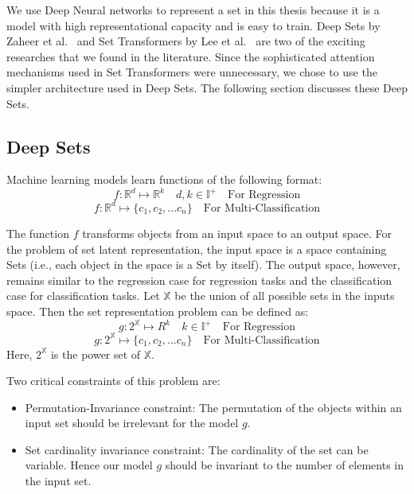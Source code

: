 \documentclass[12pt, twoside, ngerman]{report}
\begin{document}
We use Deep Neural networks to represent a set in this thesis because it is a model with high representational capacity and is easy to train.
Deep Sets by Zaheer et al.~\cite{deepSets} and Set Transformers by Lee et al.~\cite{setTransformer} are two of the exciting researches that we found in the literature.
Since the sophisticated attention mechanisms used in Set Transformers were unnecessary,  we chose to use the simpler architecture used in Deep Sets.
The following section discusses these Deep Sets.

\subsection{Deep Sets}
\label{sec:DeepSets}

Machine learning models learn functions of the following format:
$$
f : \mathbb{R}^d \mapsto \mathbb{R}^k \quad d,k \in \mathbb{I}^+ \quad \textrm{For Regression}
$$
$$
f : \mathbb{R}^d \mapsto \{c_1, c_2, ... c_n\}  \quad \textrm{For Multi-Classification}
$$

The function $f$ transforms objects from an input space to an output space.
For the problem of set latent representation, the input space is a space containing Sets (i.e., each object in the space is a Set by itself).
The output space, however, remains similar to the regression case for regression tasks and the classification case for classification tasks.
Let $\mathbb{X}$ be the union of all possible sets in the inputs space.
Then the set representation problem can be defined as:
$$
g : 2^{\mathbb{X}} \mapsto R^k   \quad k \in \mathbb{I}^+ \quad \textrm{For Regression}
$$
$$
g : 2^{\mathbb{X}} \mapsto \{c_1, c_2, ... c_n\}  \quad \textrm{For Multi-Classification}
$$
Here, $2^{\mathbb{X}}$ is the power set of $\mathbb{X}$.

Two critical constraints of this problem are:
\begin{itemize}
\item Permutation-Invariance constraint: The permutation of the objects within an input set should be irrelevant for the model $g$.
\item Set cardinality invariance constraint: The cardinality of the set can be variable.
Hence our model $g$ should be invariant to the number of elements in the input set.
\end{itemize}
\end{document}

